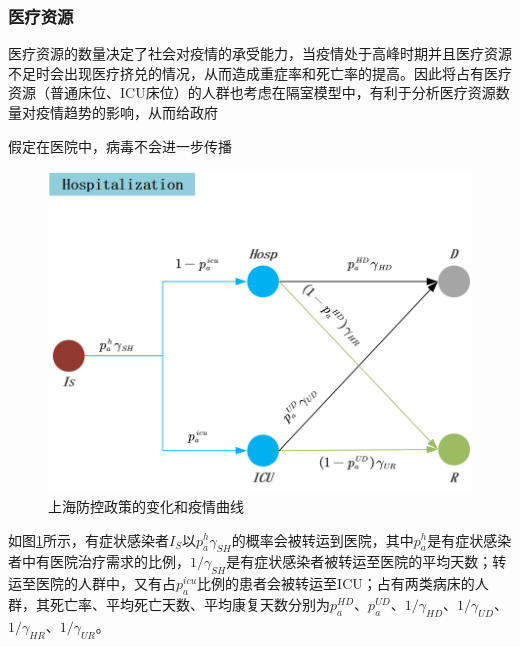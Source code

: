 \documentclass[bwprint]{gmcmthesis}
\numberwithin{figure}{section}
\begin{document}
\subsubsection{医疗资源}
医疗资源的数量决定了社会对疫情的承受能力，当疫情处于高峰时期并且医疗资源不足时会出现医疗挤兑的情况，从而造成重症率和死亡率的提高。因此将占有医疗资源（普通床位、ICU床位）的人群也考虑在隔室模型中，有利于分析医疗资源数量对疫情趋势的影响，从而给政府
\par 假定在医院中，病毒不会进一步传播
\begin{figure}[!h]
\centering
\includegraphics[width=.75\textwidth]{hospital.png}
\caption{上海防控政策的变化和疫情曲线}
\label{hos}
\end{figure}
如图\ref{hos}所示，有症状感染者$I_S$以$p_a^h\gamma_{SH}$的概率会被转运到医院，其中$p_a^h$是有症状感染者中有医院治疗需求的比例，$1/\gamma_{SH}$是有症状感染者被转运至医院的平均天数；转运至医院的人群中，又有占$p_a^{icu}$比例的患者会被转运至ICU；占有两类病床的人群，其死亡率、平均死亡天数、平均康复天数分别为$p_a^{HD}$、$p_a^{UD}$、$1/\gamma_{HD}$、$1/\gamma_{UD}$、$1/\gamma_{HR}$、$1/\gamma_{UR}$。
\end{document}
